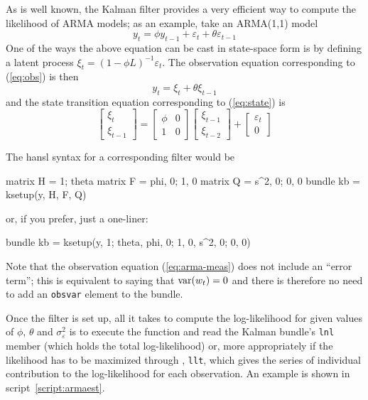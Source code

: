 \documentclass[a4paper]{article}
\begin{document}
As is well known, the Kalman filter provides a very efficient way to
compute the likelihood of ARMA models; as an example, take an
ARMA(1,1) model
\[
  y_t = \phi y_{t-1} + \varepsilon_t + \theta \varepsilon_{t-1}
\]
One of the ways the above equation can be cast in state-space form is
by defining a latent process $\xi_t = (1 - \phi L)^{-1}
\varepsilon_t$.   The observation equation corresponding to (\ref{eq:obs})
is then
%
\begin{equation}
y_t = \xi_t + \theta \xi_{t-1} \label{eq:arma-meas}
\end{equation}
%
and the state transition equation corresponding to (\ref{eq:state}) is
%
\[
  \left[ \begin{array}{c} \xi_t \\ \xi_{t-1} \end{array} \right] =
  \left[ \begin{array}{cc} \phi & 0 \\ 1 & 0 \end{array} \right]
  \left[ \begin{array}{c} \xi_{t-1} \\ \xi_{t-2} \end{array} \right] +
  \left[ \begin{array}{c} \varepsilon_t \\ 0 \end{array} \right] 
\]

The \textsf{hansl} syntax for a corresponding filter would be
\begin{code}
matrix H = {1; theta}
matrix F = {phi, 0; 1, 0}
matrix Q = {s^2, 0; 0, 0}
bundle kb = ksetup(y, H, F, Q)
\end{code}
%
or, if you prefer, just a one-liner:
\begin{code}
bundle kb = ksetup(y, {1; theta}, {phi, 0; 1, 0}, {s^2, 0; 0, 0})
\end{code}

Note that the observation equation (\ref{eq:arma-meas}) does not
include an ``error term''; this is equivalent to saying that
$\mbox{var}(w_t) = 0$ and there is therefore no need to add
an \texttt{obsvar} element to the bundle.

Once the filter is set up, all it takes to compute the log-likelihood
for given values of $\phi$, $\theta$ and $\sigma^2_{\varepsilon}$ is
to execute the  function and read the Kalman
bundle's \texttt{lnl} member (which holds the total log-likelihood)
or, more appropriately if the likelihood has to be maximized through
, \texttt{llt}, which gives the series of individual
contribution to the log-likelihood for each observation. An example is
shown in script~\ref{script:armaest}.
\end{document}
